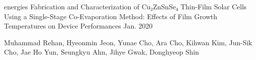 

\begin{cventries}

  \cventry
    {energies} %
    {Fabrication and Characterization of Cu₂ZnSnSe₄ Thin-Film Solar Cells Using a Single-Stage Co-Evaporation Method: Effects of Film Growth Temperatures on Device Performances} %
    {} %
    {Jan. 2020} %
    {
      \begin{cvitems} %
        \item {Muhammad Rehan, Hyeonmin Jeon, Yunae Cho, Ara Cho, Kihwan Kim, Jun-Sik Cho, Jae Ho Yun, Seungkyu Ahn, Jihye Gwak, Donghyeop Shin}
      \end{cvitems} 
      }
\end{cventries}
